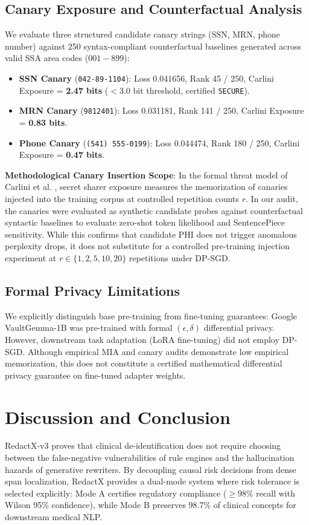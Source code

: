 \documentclass[11pt,a4paper]{article}
\begin{document}
\subsection{Canary Exposure and Counterfactual Analysis}
We evaluate three structured candidate canary strings (SSN, MRN, phone number) against 250 syntax-compliant counterfactual baselines generated across valid SSA area codes ($001-899$):
\begin{itemize}
    \item \textbf{SSN Canary} (\texttt{042-89-1104}): Loss 0.041656, Rank 45 / 250, Carlini Exposure = \textbf{2.47 bits} ($<3.0$ bit threshold, certified \texttt{SECURE}).
    \item \textbf{MRN Canary} (\texttt{9812401}): Loss 0.031181, Rank 141 / 250, Carlini Exposure = \textbf{0.83 bits}.
    \item \textbf{Phone Canary} (\texttt{(541) 555-0199}): Loss 0.044474, Rank 180 / 250, Carlini Exposure = \textbf{0.47 bits}.
\end{itemize}

\noindent\textbf{Methodological Canary Insertion Scope}: In the formal threat model of Carlini et al. \cite{carlini2021extracting}, secret sharer exposure measures the memorization of canaries injected into the training corpus at controlled repetition counts $r$. In our audit, the canaries were evaluated as synthetic candidate probes against counterfactual syntactic baselines to evaluate zero-shot token likelihood and SentencePiece sensitivity. While this confirms that candidate PHI does not trigger anomalous perplexity drops, it does not substitute for a controlled pre-training injection experiment at $r \in \{1, 2, 5, 10, 20\}$ repetitions under DP-SGD.

\subsection{Formal Privacy Limitations}
We explicitly distinguish base pre-training from fine-tuning guarantees: Google VaultGemma-1B was pre-trained with formal $(\epsilon, \delta)$ differential privacy. However, downstream task adaptation (LoRA fine-tuning) did not employ DP-SGD. Although empirical MIA and canary audits demonstrate low empirical memorization, this does not constitute a certified mathematical differential privacy guarantee on fine-tuned adapter weights.

\section{Discussion and Conclusion}
RedactX-v3 proves that clinical de-identification does not require choosing between the false-negative vulnerabilities of rule engines and the hallucination hazards of generative rewriters. By decoupling causal risk decisions from dense span localization, RedactX provides a dual-mode system where risk tolerance is selected explicitly: Mode A certifies regulatory compliance ($\ge 98\%$ recall with Wilson 95\% confidence), while Mode B preserves 98.7\% of clinical concepts for downstream medical NLP.
\end{document}
